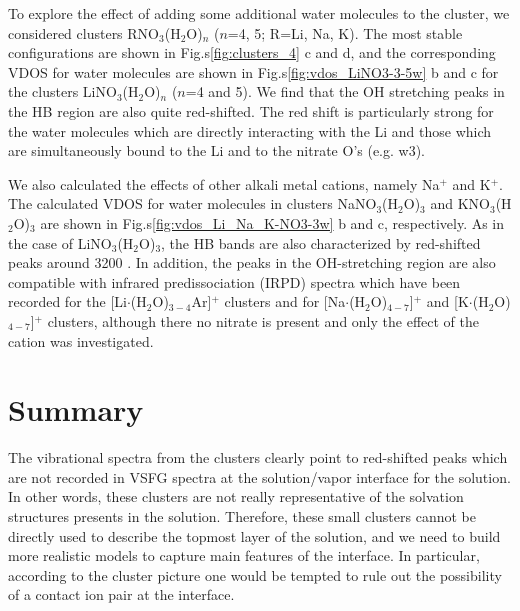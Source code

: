 To explore the effect of adding some additional water molecules to
the cluster, we considered clusters RNO$_3$(H$_2$O)$_n$ ($n$=4, 5; R=Li, Na, K).
The most stable configurations are shown in Fig.s\thinspace\ref{fig:clusters_4} c and d,
and the corresponding VDOS for water molecules are shown in
Fig.s\thinspace\ref{fig:vdos_LiNO3-3-5w} b and c for the clusters LiNO$_3$(H$_2$O)$_n$
($n$=4 and 5). We find that the OH stretching peaks in the HB region are also quite red-shifted.
The red shift is particularly strong for the water molecules which are directly interacting with
the Li and those which are simultaneously bound to the Li and to the nitrate O's (e.g. w3).

%

We also calculated the effects of other alkali metal cations, namely Na$^+$ and K$^+$. 
The calculated VDOS for water molecules in clusters NaNO$_3$(H$_2$O)$_3$ and KNO$_3$(H$_2$O)$_3$ are shown in 
Fig.s\thinspace\ref{fig:vdos_Li_Na_K-NO3-3w} b and c, respectively. As in the case of LiNO$_3$(H$_2$O)$_3$, the HB 
bands are also characterized by red-shifted peaks around 3200 \centimeter.
In addition, the peaks in the OH-stretching region are also compatible with infrared predissociation
(IRPD) spectra which have been recorded for the [Li$\cdot$(H$_2$O)$_{3-4}$Ar]$^+$
clusters\cite{rodriguez2011, Miller2008, Miller2008b}
and for [Na$\cdot$(H$_2$O)$_{4-7}$]$^+$ and [K$\cdot$(H$_2$O)$_{4-7}$]$^+$ clusters\cite{beck2011}, although there no
nitrate is present and only the effect of the cation was investigated.
%	
\section{Summary}
The vibrational spectra from the clusters clearly point to red-shifted peaks which are not 
recorded in VSFG spectra at the solution/vapor interface for the \LiN solution. 
In other words, these clusters are not really representative of the solvation structures presents in the \LiN solution.
Therefore, these small clusters cannot be directly used to describe the topmost layer of the \LiN solution, 
and we need to build more realistic models to capture main features of the interface. 
In particular, according to the cluster picture one would be tempted to rule out the possibility of a contact 
ion pair at the interface.

